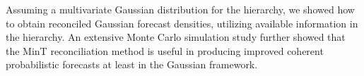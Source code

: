 \documentclass[a4paper, 11pt]{article}
\begin{document}
Assuming a multivariate Gaussian distribution for the hierarchy, we showed how to obtain reconciled Gaussian forecast densities, utilizing available information in the hierarchy. An extensive Monte Carlo simulation study further showed that the MinT reconciliation method \citep{Wickramasuriya2017} is useful in producing improved coherent probabilistic forecasts at least in the Gaussian framework.


\newpage
\printbibliography
\end{document}

